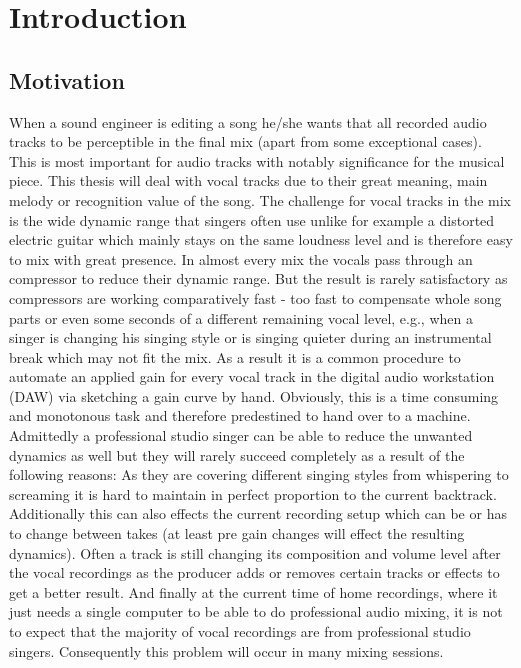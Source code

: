 \chapter{Introduction}
\label{chapter:introduction}

\section{Motivation}

When a sound engineer is editing a song he/she wants that all recorded audio tracks to be perceptible in the final mix (apart from some exceptional cases). This is most important for audio tracks with notably significance for the musical piece. This thesis will deal with vocal tracks due to their great meaning, main melody or recognition value of the song. The challenge for vocal tracks in the mix is the wide dynamic range that singers often use unlike for example a distorted electric guitar which mainly stays on the same loudness level and is therefore easy to mix with great presence. In almost every mix the vocals pass through an compressor to reduce their dynamic range. But the result is rarely satisfactory as compressors are working comparatively fast - too fast to compensate whole song parts or even some seconds of a different remaining vocal level, e.g., when a singer is changing his singing style or is singing quieter during an instrumental break which may not fit the mix. As a result it is a common procedure to automate an applied gain for every vocal track in the digital audio workstation (DAW) via sketching a gain curve by hand. Obviously, this is a time consuming and monotonous task and therefore predestined to hand over to a machine.\\
Admittedly a professional studio singer can be able to reduce the unwanted dynamics as well but they will rarely succeed completely as a result of the following reasons: As they are covering different singing styles from whispering to screaming it is hard to maintain in perfect proportion to the current backtrack. Additionally this can also effects the current recording setup which can be or has to change between takes (at least pre gain changes will effect the resulting dynamics). Often a track is still changing its composition and volume level after the vocal recordings as the producer adds or removes certain tracks or effects to get a better result. And finally at the current time of home recordings, where it just needs a single computer to be able to do professional audio mixing, it is not to expect that the majority of vocal recordings are from professional studio singers. Consequently this problem will occur in many mixing sessions.\\

